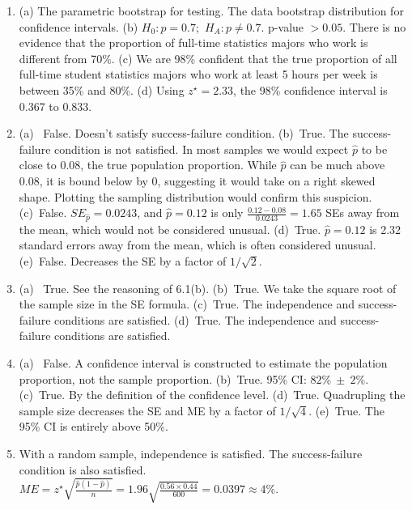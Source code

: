 \documentclass[
  10pt,
  openany]{book}
\begin{document}
\begin{enumerate}
  \addtocounter{enumi}{1}
\item
  (a) The parametric bootstrap for testing. The data bootstrap distribution for confidence intervals. (b) \(H_0: p = 0.7;\) \(H_A: p \ne 0.7.\) p-value \(> 0.05.\) There is no evidence that the proportion of full-time statistics majors who work is different from 70\%. (c) We are 98\% confident that the true proportion of all full-time student statistics majors who work at least 5 hours per week is between 35\% and 80\%. (d) Using \(z^\star = 2.33\), the 98\% confidence interval is 0.367 to 0.833.

  \addtocounter{enumi}{1}
\item
  (a) ~False. Doesn't satisfy success-failure condition. (b)~True. The success-failure condition is not satisfied. In most samples we would expect \(\hat{p}\) to be close to 0.08, the true population proportion. While \(\hat{p}\) can be much above 0.08, it is bound below by 0, suggesting it would take on a right skewed shape. Plotting the sampling distribution would confirm this suspicion. (c)~False. \(SE_{\hat{p}} = 0.0243\), and \(\hat{p} = 0.12\) is only \(\frac{0.12 - 0.08}{0.0243} = 1.65\) SEs away from the mean, which would not be considered unusual. (d)~True. \(\hat{p}=0.12\) is 2.32 standard errors away from the mean, which is often considered unusual. (e)~False. Decreases the SE by a factor of \(1/\sqrt{2}\).

  \addtocounter{enumi}{1}
\item
  (a) ~True. See the reasoning of 6.1(b). (b)~True. We take the square root of the sample size in the SE formula. (c)~True. The independence and success-failure conditions are satisfied. (d)~True. The independence and success-failure conditions are satisfied.

  \addtocounter{enumi}{1}
\item
  (a) ~False. A confidence interval is constructed to estimate the population proportion, not the sample proportion. (b)~True. 95\% CI: \(82\%\ \pm\ 2\%\). (c)~True. By the definition of the confidence level. (d)~True. Quadrupling the sample size decreases the SE and ME by a factor of \(1/\sqrt{4}\). (e)~True. The 95\% CI is entirely above 50\%.

  \addtocounter{enumi}{1}
\item
  With a random sample, independence is satisfied. The success-failure condition is also satisfied. \(ME = z^{\star} \sqrt{ \frac{\hat{p} (1-\hat{p})} {n} } = 1.96 \sqrt{ \frac{0.56 \times 0.44}{600} }= 0.0397 \approx 4\%.\)


\end{enumerate}
\end{document}
